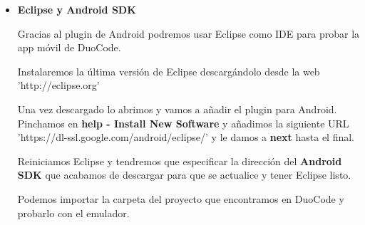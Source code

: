 \begin{itemize}
\item \textbf{Eclipse y Android SDK}

Gracias al plugin de Android podremos usar Eclipse como IDE para probar la app móvil de DuoCode.

Instalaremos la última versión de Eclipse descargándolo desde la web 'http://eclipse.org'

Una vez descargado lo abrimos y vamos a añadir el plugin para Android.
Pinchamos en \textbf{help - Install New Software } y añadimos la siguiente URL 'https://dl-ssl.google.com/android/eclipse/' y le damos a \textbf{next} hasta el final.

Reiniciamos Eclipse y tendremos que especificar la dirección del \textbf{Android SDK} que acabamos de descargar para que se actualice y tener Eclipse listo.

Podemos importar la carpeta del proyecto que encontramos en DuoCode y probarlo con el emulador.

\end{itemize}

